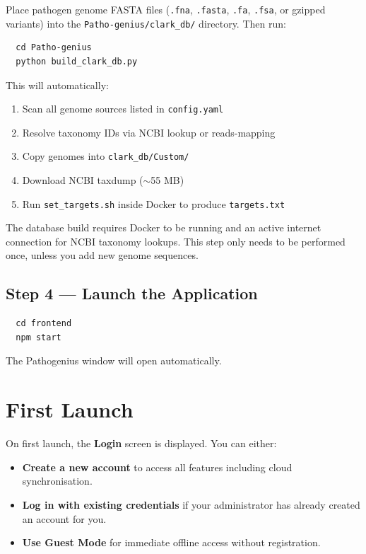 \documentclass[12pt,a4paper]{report}
\begin{document}
Place pathogen genome FASTA files (\texttt{.fna}, \texttt{.fasta}, \texttt{.fa}, \texttt{.fsa}, or gzipped variants) into the \texttt{Patho-genius/clark\_db/} directory. Then run:

\begin{verbatim}
  cd Patho-genius
  python build_clark_db.py
\end{verbatim}

This will automatically:
\begin{enumerate}[leftmargin=1.5em]
  \item Scan all genome sources listed in \texttt{config.yaml}
  \item Resolve taxonomy IDs via NCBI lookup or reads-mapping
  \item Copy genomes into \texttt{clark\_db/Custom/}
  \item Download NCBI taxdump ($\sim$55 MB)
  \item Run \texttt{set\_targets.sh} inside Docker to produce \texttt{targets.txt}
\end{enumerate}

\begin{notebox}
  The database build requires Docker to be running and an active internet connection for NCBI taxonomy lookups. This step only needs to be performed once, unless you add new genome sequences.
\end{notebox}

\subsection{Step 4 — Launch the Application}

\begin{verbatim}
  cd frontend
  npm start
\end{verbatim}

The Pathogenius window will open automatically.

\section{First Launch}

On first launch, the \textbf{Login} screen is displayed. You can either:
\begin{itemize}[leftmargin=1.5em]
  \item \textbf{Create a new account} to access all features including cloud synchronisation.
  \item \textbf{Log in with existing credentials} if your administrator has already created an account for you.
  \item \textbf{Use Guest Mode} for immediate offline access without registration.
\end{itemize}
\end{document}
